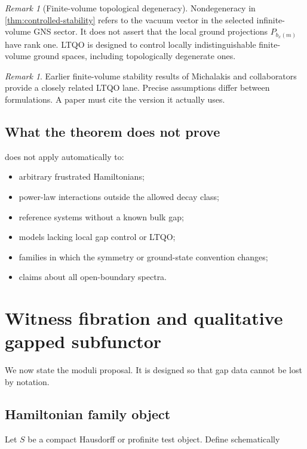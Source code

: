 \documentclass[12pt]{article}
\theoremstyle{definition}
\theoremstyle{remark}
\newtheorem{remark}[theorem]{Remark}
\begin{document}
\begin{remark}[Finite-volume topological degeneracy]
Nondegeneracy in \cref{thm:controlled-stability} refers to the vacuum vector in
the selected infinite-volume GNS sector. It does not assert that the local
ground projections $P_{b_x(m)}$ have rank one. LTQO is designed to control
locally indistinguishable finite-volume ground spaces, including topologically
degenerate ones.
\end{remark}

\begin{remark}
Earlier finite-volume stability results of Michalakis and collaborators
provide a closely related LTQO lane. Precise assumptions differ between
formulations. A paper must cite the version it actually uses.
\end{remark}

\subsection{What the theorem does not prove}

 does not apply automatically to:

\begin{itemize}
  \item arbitrary frustrated Hamiltonians;
  \item power-law interactions outside the allowed decay class;
  \item reference systems without a known bulk gap;
  \item models lacking local gap control or LTQO;
  \item families in which the symmetry or ground-state convention changes;
  \item claims about all open-boundary spectra.
\end{itemize}

\section{Witness fibration and qualitative gapped subfunctor}

We now state the moduli proposal. It is designed so that gap data cannot be
lost by notation.

\subsection{Hamiltonian family object}

Let $S$ be a compact Hausdorff or profinite test object. Define schematically
\end{document}
